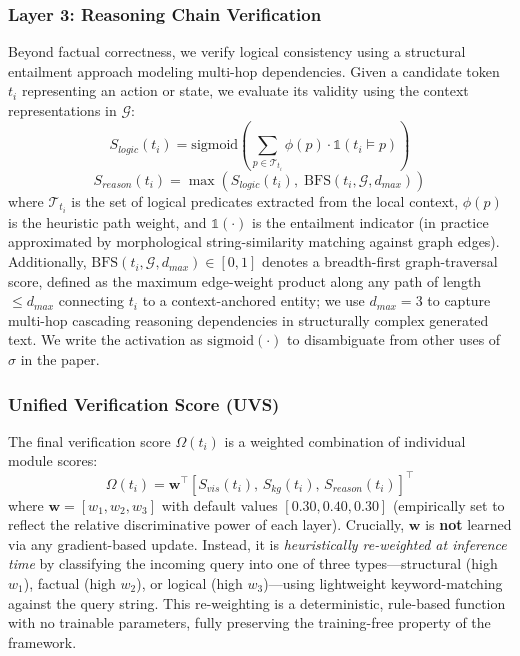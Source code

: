 \subsubsection{Layer 3: Reasoning Chain Verification}
\label{sec:layer3}
Beyond factual correctness, we verify logical consistency using a structural entailment approach modeling multi-hop dependencies. Given a candidate token $t_i$ representing an action or state, we evaluate its validity using the context representations in $\mathcal{G}$:
\begin{equation}
S_{logic}(t_i) = \mathrm{sigmoid}\!\left( \sum_{p \in \mathcal{T}_{t_i}} \phi(p) \cdot \mathbb{1}(t_i \models p) \right)
\end{equation}
\begin{equation}
S_{reason}(t_i) = \max \!\left( S_{logic}(t_i),\; \mathrm{BFS}(t_i, \mathcal{G}, d_{max}) \right)
\end{equation}
where $\mathcal{T}_{t_i}$ is the set of logical predicates extracted from the local context, $\phi(p)$ is the heuristic path weight, and $\mathbb{1}(\cdot)$ is the entailment indicator (in practice approximated by morphological string-similarity matching against graph edges). Additionally, $\mathrm{BFS}(t_i, \mathcal{G}, d_{max}) \in [0,1]$ denotes a breadth-first graph-traversal score, defined as the maximum edge-weight product along any path of length $\leq d_{max}$ connecting $t_i$ to a context-anchored entity; we use $d_{max}=3$ to capture multi-hop cascading reasoning dependencies in structurally complex generated text. We write the activation as $\mathrm{sigmoid}(\cdot)$ to disambiguate from other uses of $\sigma$ in the paper.

\subsubsection{Unified Verification Score (UVS)}
The final verification score $\Omega(t_i)$ is a weighted combination of individual module scores:
\begin{equation}
\Omega(t_i) = \mathbf{w}^{\top} [S_{vis}(t_i),\, S_{kg}(t_i),\, S_{reason}(t_i)]^{\top}
\end{equation}
where $\mathbf{w} = [w_1, w_2, w_3]$ with default values $[0.30, 0.40, 0.30]$ (empirically set to reflect the relative discriminative power of each layer). Crucially, $\mathbf{w}$ is \textbf{not} learned via any gradient-based update. Instead, it is \textit{heuristically re-weighted at inference time} by classifying the incoming query into one of three types—structural (high $w_1$), factual (high $w_2$), or logical (high $w_3$)—using lightweight keyword-matching against the query string. This re-weighting is a deterministic, rule-based function with no trainable parameters, fully preserving the training-free property of the framework.

